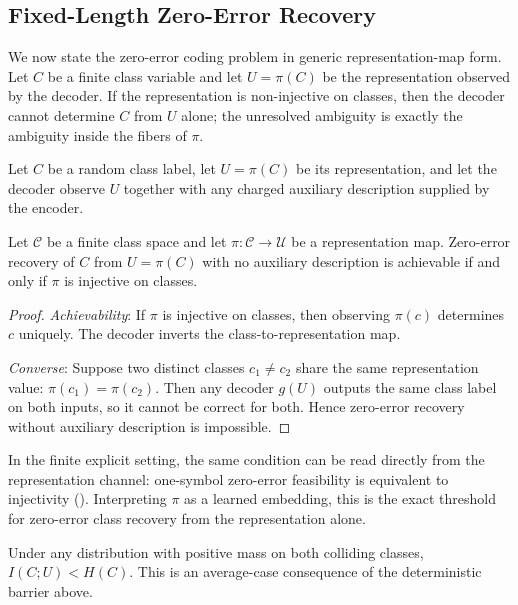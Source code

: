 \subsection{Fixed-Length Zero-Error Recovery}

We now state the zero-error coding problem in generic representation-map form. Let $C$ be a finite class variable and let $U=\pi(C)$ be the representation observed by the decoder. If the representation is non-injective on classes, then the decoder cannot determine $C$ from $U$ alone; the unresolved ambiguity is exactly the ambiguity inside the fibers of $\pi$.

\begin{definition}
Let $C$ be a random class label, let $U=\pi(C)$ be its representation, and let the decoder observe $U$ together with any charged auxiliary description supplied by the encoder.
\end{definition}

\begin{theorem}\label{thm:identification-capacity}
Let $\mathcal{C}$ be a finite class space and let $\pi : \mathcal{C} \to \mathcal{U}$ be a representation map. Zero-error recovery of $C$ from $U=\pi(C)$ with no auxiliary description is achievable if and only if $\pi$ is injective on classes.
\end{theorem}

\begin{proof}
\emph{Achievability}: If $\pi$ is injective on classes, then observing $\pi(c)$ determines $c$ uniquely. The decoder inverts the class-to-representation map.

\emph{Converse}: Suppose two distinct classes $c_1 \neq c_2$ share the same representation value: $\pi(c_1)=\pi(c_2)$. Then any decoder $g(U)$ outputs the same class label on both inputs, so it cannot be correct for both. Hence zero-error recovery without auxiliary description is impossible.
\end{proof}

In the finite explicit setting, the same condition can be read directly from the representation channel: one-symbol zero-error feasibility is equivalent to injectivity (). Interpreting $\pi$ as a learned embedding, this is the exact threshold for zero-error class recovery from the representation alone.

\begin{remark}
Under any distribution with positive mass on both colliding classes, $I(C;U) < H(C)$. This is an average-case consequence of the deterministic barrier above.
\end{remark}


